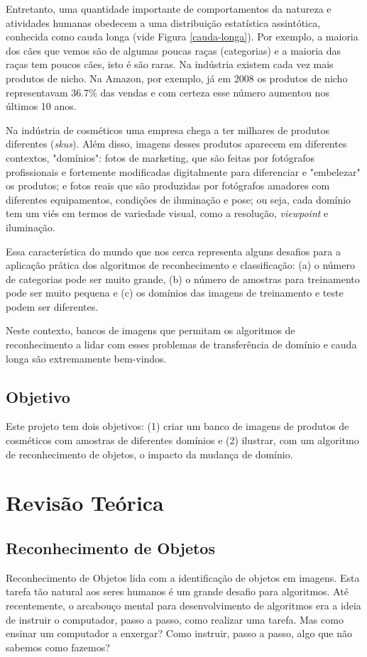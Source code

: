 \documentclass[conference]{IEEEtran}
\begin{document}
Entretanto, uma quantidade importante de comportamentos da natureza e atividades humanas obedecem a uma distribuição estatística assintótica, conhecida como cauda longa (vide Figura \ref{cauda-longa}). Por exemplo, a maioria dos cães que vemos são de algumas poucas raças (categorias) e a maioria das raças tem poucos cães, isto é são raras. Na indústria existem cada vez mais produtos de nicho. Na Amazon, por exemplo, já em 2008 os produtos de nicho representavam 36.7\% das vendas \cite{erik} e com certeza esse número aumentou nos últimos 10 anos. 

Na indústria de cosméticos uma empresa chega a ter milhares de produtos diferentes (\textit{skus}). Além disso, imagens desses produtos aparecem em diferentes contextos, "domínios": fotos de marketing, que são feitas por fotógrafos profissionais e fortemente modificadas digitalmente para diferenciar e "embelezar" os produtos; e fotos reais que são produzidas por fotógrafos amadores com diferentes equipamentos, condições de iluminação e pose; ou seja, cada domínio tem um viés em termos de variedade visual, como a resolução, \textit{viewpoint} e iluminação.

Essa característica do mundo que nos cerca representa alguns desafios para a aplicação prática dos algoritmos de reconhecimento e classificação: (a) o número de categorias pode ser muito grande, (b) o número de amostras para treinamento pode ser muito pequena\cite{horn} e (c) os domínios das imagens de treinamento e teste podem ser diferentes. 

Neste contexto, bancos de imagens que permitam os algoritmos de reconhecimento a lidar com esses problemas de transferência de domínio e cauda longa são extremamente bem-vindos. 

\subsection{Objetivo}
Este projeto tem dois objetivos: (1) criar um banco de imagens de produtos de cosméticos com amostras de diferentes domínios e (2) ilustrar, com um algoritmo de reconhecimento de objetos, o impacto da mudança de domínio. 

\section{Revisão Teórica}

\subsection{Reconhecimento de Objetos}
Reconhecimento de Objetos lida com a identificação de objetos em imagens. Esta tarefa tão natural aos seres humanos é um grande desafio para algoritmos. Até recentemente, o arcabouço mental para desenvolvimento de algoritmos era a ideia de instruir o computador, passo a passo, como realizar uma tarefa. Mas como ensinar um computador a enxergar? Como instruir, passo a passo, algo que não sabemos como fazemos?
\end{document}
